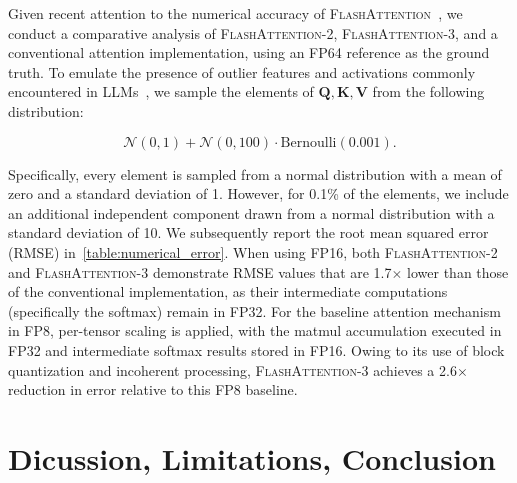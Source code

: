 \begin{itemize}
Given recent attention to the numerical accuracy of \textsc{FlashAttention}~\citep{golden2024flash}, we conduct a comparative analysis of \textsc{FlashAttention-2}, \textsc{FlashAttention-3}, and a conventional attention implementation, using an FP64 reference as the ground truth. To emulate the presence of outlier features and activations commonly encountered in LLMs~\citep{dettmers2208llm, sun2024massive}, we sample the elements of $\mathbf{Q}, \mathbf{K}, \mathbf{V}$ from the following distribution:

\begin{equation*}
  \mathcal{N}(0, 1) + \mathcal{N}(0, 100) \cdot \mathrm{Bernoulli}(0.001).
\end{equation*}

Specifically, every element is sampled from a normal distribution with a mean of zero and a standard deviation of 1. However, for 0.1\% of the elements, we include an additional independent component drawn from a normal distribution with a standard deviation of 10. We subsequently report the root mean squared error (RMSE) in~\cref{table:numerical_error}. When using FP16, both \textsc{FlashAttention-2} and \textsc{FlashAttention-3} demonstrate RMSE values that are 1.7$\times$ lower than those of the conventional implementation, as their intermediate computations (specifically the softmax) remain in FP32. For the baseline attention mechanism in FP8, per-tensor scaling is applied, with the matmul accumulation executed in FP32 and intermediate softmax results stored in FP16. Owing to its use of block quantization and incoherent processing, \textsc{FlashAttention-3} achieves a 2.6$\times$ reduction in error relative to this FP8 baseline.

\section{Dicussion, Limitations, Conclusion}
\label{sec:discussion}


\end{itemize}
